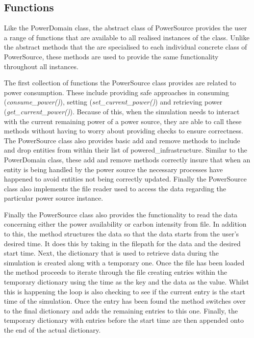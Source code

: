 \documentclass{l4proj}
\begin{document}
\subsection{Functions}\label{imp:subsec:utility-funcs}
Like the PowerDomain class, the abstract class of PowerSource provides the user a range of functions that are available to all realised instances of the class.
Unlike the abstract methods that the are specialised to each individual concrete class of PowerSource, these methods are used to provide the same functionality throughout all instances.

The first collection of functions the PowerSource class provides are related to power consumption.
These include providing safe approaches in consuming (\textit{consume\_power()}), setting (\textit{set\_current\_power()}) and retrieving power (\textit{get\_current\_power()}).
Because of this, when the simulation needs to interact with the current remaining power of a power source, they are able to call these methods without having to worry about providing checks to ensure correctness.
The PowerSource class also provides basic add and remove methods to include and drop entities from within their list of powered\_infrastructure.
Similar to the PowerDomain class, these add and remove methods correctly insure that when an entity is being handled by the power source the necessary processes have happened to avoid entities not being correctly updated.
Finally the PowerSource class also implements the file reader used to access the data regarding the particular power source instance.

Finally the PowerSource class also provides the functionality to read the data concerning either the power availability or carbon intensity from file.
In addition to this, the method structures the data so that the data starts from the user's desired time.
It does this by taking in the filepath for the data and the desired start time.
Next, the dictionary that is used to retrieve data during the simulation is created along with a temporary one.
Once the file has been loaded the method proceeds to iterate through the file creating entries within the temporary dictionary using the time as the key and the data as the value.
Whilst this is happening the loop is also checking to see if the current entry is the start time of the simulation.
Once the entry has been found the method switches over to the final dictionary and adds the remaining entries to this one.
Finally, the temporary dictionary with entries before the start time are then appended onto the end of the actual dictionary.
\end{document}
